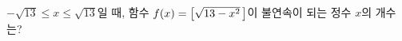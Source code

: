 $-\sqrt{13}\le x\le\sqrt{13}$일 때, 함수 $f(x)=\left[\sqrt{13-x^2}\mkern3mu \right]$이 불연속이 되는 정수 $x$의 개수는? 
